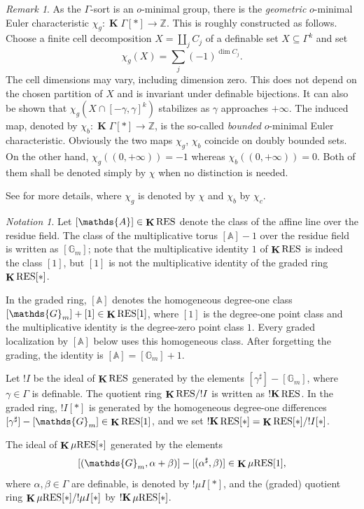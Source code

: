\documentclass[12pt]{amsart}
\newcommand{\memph}[1]{{\color{magenta}\emph{#1}}}
\theoremstyle{plain}
\theoremstyle{definition}
\theoremstyle{remark}
\newtheorem{rem}[thm]{Remark}
\newtheorem{nota}[thm]{Notation}
\numberwithin{equation}{section}
\theoremstyle{plain}
\newcommand{\Z}{\mathds{Z}}
\newcommand{\A}{\mathds{A}}
\newcommand{\G}{\mathds{G}}
\newcommand{\omin}{$o$\nobreakdash}
\newcommand{\0}{\emptyset}
\newcommand{\fun}{\longrightarrow}
\newcommand{\sub}{\subseteq}
\newcommand{\RES}{\textup{RES}}
\newcommand{\mgRES}{{\mu}{\RES}}
\DeclareMathOperator{\ggk}{\mathbf{K}}
\DeclareMathOperator{\sggk}{!\mathbf{K}}
\begin{document}
\begin{rem}
As  the  $\Gamma$-sort is an \omin-minimal group, there is  the \memph{geometric} \omin-minimal Euler characteristic  $\chi_g : \ggk \Gamma[*] \fun \Z$. This is roughly constructed as follows. Choose a finite cell decomposition $X=\coprod_j C_j$ of a definable set $X\sub\Gamma^k$ and set
\[
\chi_g(X)=\sum_j(-1)^{\dim C_j}.
\]
The cell dimensions may vary, including dimension zero.
This does not depend on the chosen partition of $X$ and is invariant under definable bijections. It can also be shown that $\chi_g(X \cap [-\gamma, \gamma]^k)$ stabilizes as $\gamma$ approaches $+\infty$. The induced map, denoted by $\chi_b: \ggk \Gamma[*] \fun \Z$,  is the so-called \memph{bounded} \omin-minimal Euler characteristic. Obviously the two maps $\chi_g$, $\chi_b$  coincide on doubly bounded sets. On the other hand,  $\chi_g((0,+\infty))=-1$ whereas $\chi_b((0,+\infty))=0$. Both of them shall be denoted simply by $\chi$ when no distinction is needed.


See \cite[\S~9]{hrushovski:kazhdan:integration:vf} for more details, where $\chi_g$ is denoted by $\chi$ and $\chi_b$ by $\chi_c$.
\end{rem}


\begin{nota}\label{res:note}
Let $[\A] \in \ggk \RES$ denote the class of the affine line over the residue field. The class of the multiplicative torus $[\A] - 1$ over the residue field is written as $[\G_m]$; note that the multiplicative identity $1$ of $\ggk \RES$ is indeed the class $[1]$, but $[1]$ is not the multiplicative identity of the graded ring $\ggk \RES[*]$.

In the graded ring, $[\A]$ denotes the homogeneous degree-one class $[\G_m]+[1]\in\ggk\RES[1]$, where $[1]$ is the degree-one point class and the multiplicative identity is the degree-zero point class $1$. Every graded localization by $[\A]$ below uses this homogeneous class. After forgetting the grading, the identity is $[\A]=[\G_m]+1$.


Let $!I$ be the ideal of $\ggk \RES$ generated by the elements $[\gamma^\sharp] - [\G_m]$, where $\gamma \in \Gamma$ is definable. The quotient ring $\ggk \RES / !I$ is written as $\sggk \RES$. In the graded ring, $!I[*]$ is generated by the homogeneous degree-one differences $[\gamma^\sharp]-[\G_m]\in\ggk\RES[1]$, and we set $\sggk\RES[*]=\ggk\RES[*]/!I[*]$.

The ideal of $\ggk \mgRES[*]$ generated by the  elements
\[
[(\G_m, \alpha + \beta)] - [(\alpha^\sharp, \beta)] \in \ggk \mgRES[1],
\]
where $\alpha, \beta \in \Gamma$ are definable, is denoted by $!\mu I[*]$, and the (graded) quotient ring $\ggk \mgRES[*] / !\mu I[*]$ by $\sggk \mgRES[*]$.
\end{nota}
\end{document}
